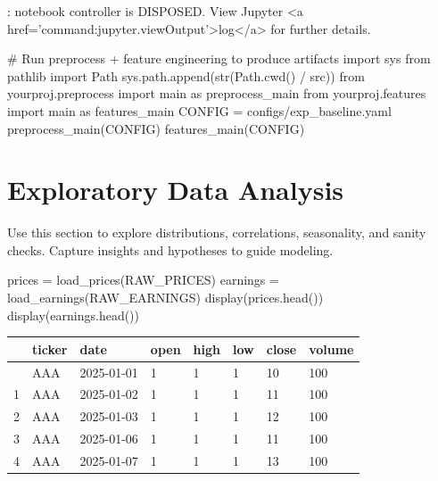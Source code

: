 \documentclass[
  letterpaper,
  DIV=11,
  numbers=noendperiod]{scrartcl}
\newenvironment{Shaded}{\begin{snugshade}}{\end{snugshade}}
\newcommand{\BuiltInTok}[1]{\textcolor[rgb]{0.00,0.23,0.31}{#1}}
\newcommand{\CommentTok}[1]{\textcolor[rgb]{0.37,0.37,0.37}{#1}}
\newcommand{\ImportTok}[1]{\textcolor[rgb]{0.00,0.46,0.62}{#1}}
\newcommand{\NormalTok}[1]{\textcolor[rgb]{0.00,0.23,0.31}{#1}}
\newcommand{\OperatorTok}[1]{\textcolor[rgb]{0.37,0.37,0.37}{#1}}
\newcommand{\StringTok}[1]{\textcolor[rgb]{0.13,0.47,0.30}{#1}}
\renewenvironment{Shaded}{%
  \begin{tcolorbox}[%
    enhanced,%
    colback=codebg,%
    colframe=codebg,%
    borderline west={3pt}{0pt}{sectionblue},%
    boxrule=0pt,%
    arc=0pt,%
    boxsep=5pt,%
    left=2mm,%
    right=2mm,%
    top=2mm,%
    bottom=2mm%
  ]%
}{%
  \end{tcolorbox}%
}
\begin{document}
\begin{Highlighting}
\textcolor{black}{: }
\textcolor{black}{}\textcolor{QuartoInternalColor1}{notebook controller is DISPOSED. }
\textcolor{QuartoInternalColor1}{}\textcolor{QuartoInternalColor1}{View Jupyter <a href='command:jupyter.viewOutput'>log</a> for further details.}
\end{Highlighting}

\begin{Shaded}
\begin{Highlighting}[]
\CommentTok{\# Run preprocess + feature engineering to produce artifacts}
\ImportTok{import}\NormalTok{ sys}
\ImportTok{from}\NormalTok{ pathlib }\ImportTok{import}\NormalTok{ Path}
\NormalTok{sys.path.append(}\BuiltInTok{str}\NormalTok{(Path.cwd() }\OperatorTok{/} \StringTok{\textquotesingle{}src\textquotesingle{}}\NormalTok{))}
\ImportTok{from}\NormalTok{ yourproj.preprocess }\ImportTok{import}\NormalTok{ main }\ImportTok{as}\NormalTok{ preprocess\_main}
\ImportTok{from}\NormalTok{ yourproj.features }\ImportTok{import}\NormalTok{ main }\ImportTok{as}\NormalTok{ features\_main}
\NormalTok{CONFIG }\OperatorTok{=} \StringTok{\textquotesingle{}configs/exp\_baseline.yaml\textquotesingle{}}
\NormalTok{preprocess\_main(CONFIG)}
\NormalTok{features\_main(CONFIG)}
\end{Highlighting}
\end{Shaded}

\section{Exploratory Data Analysis}\label{exploratory-data-analysis}

Use this section to explore distributions, correlations, seasonality,
and sanity checks. Capture insights and hypotheses to guide modeling.

\begin{Shaded}
\begin{Highlighting}[]
\NormalTok{prices }\OperatorTok{=}\NormalTok{ load\_prices(RAW\_PRICES)}
\NormalTok{earnings }\OperatorTok{=}\NormalTok{ load\_earnings(RAW\_EARNINGS)}
\NormalTok{display(prices.head())}
\NormalTok{display(earnings.head())}
\end{Highlighting}
\end{Shaded}

\begin{longtable}[]{@{}llllllll@{}}
\toprule\noalign{}
& ticker & date & open & high & low & close & volume \\
\midrule\noalign{}
\endhead
\bottomrule\noalign{}
\endlastfoot
0 & AAA & 2025-01-01 & 1 & 1 & 1 & 10 & 100 \\
1 & AAA & 2025-01-02 & 1 & 1 & 1 & 11 & 100 \\
2 & AAA & 2025-01-03 & 1 & 1 & 1 & 12 & 100 \\
3 & AAA & 2025-01-06 & 1 & 1 & 1 & 11 & 100 \\
4 & AAA & 2025-01-07 & 1 & 1 & 1 & 13 & 100 \\
\end{longtable}
\end{document}
